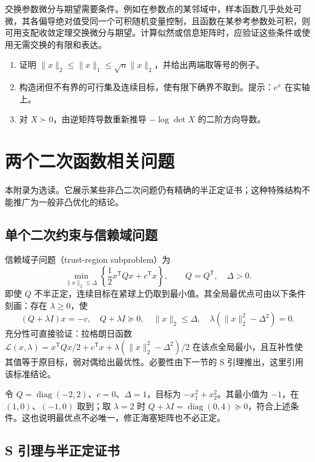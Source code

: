 \documentclass[UTF8,12pt,a4paper,fontset=fandol]{ctexbook}
\begin{document}
交换参数微分与期望需要条件。例如在参数点的某邻域中，样本函数几乎处处可微，其各偏导绝对值受同一个可积随机变量控制，且函数在某参考参数处可积，则可用支配收敛定理交换微分与期望。计算似然或信息矩阵时，应验证这些条件或使用无需交换的有限和表达。

\begin{enumerate}
 \item 证明 $\|x\|_2\leq\|x\|_1\leq\sqrt n\|x\|_2$，并给出两端取等号的例子。
 \item 构造闭但不有界的可行集及连续目标，使有限下确界不取到。提示：$e^x$ 在实轴上。
 \item 对 $X\succ0$，由逆矩阵导数重新推导 $-\log\det X$ 的二阶方向导数。
\end{enumerate}

\chapter{两个二次函数相关问题}
\label{app:co-quadratic}

本附录为选读。它展示某些非凸二次问题仍有精确的半正定证书；这种特殊结构不能推广为一般非凸优化的结论。

\section{单个二次约束与信赖域问题}

信赖域子问题（trust-region subproblem）为
\[
 \min_{\|x\|_2\leq\Delta}\left\{\frac12x^{\mathsf T}Qx+c^{\mathsf T}x\right\},
 \qquad Q=Q^{\mathsf T},\quad\Delta>0.
\]
即使 $Q$ 不半正定，连续目标在紧球上仍取到最小值。其全局最优点可由以下条件刻画：存在 $\lambda\geq0$，使
\[
 (Q+\lambda I)x=-c,\quad Q+\lambda I\succeq0,\quad
 \|x\|_2\leq\Delta,\quad\lambda(\|x\|_2^2-\Delta^2)=0.
\]
充分性可直接验证：拉格朗日函数 $\mathcal L(x,\lambda)=x^{\mathsf T}Qx/2+c^{\mathsf T}x+\lambda(\|x\|_2^2-\Delta^2)/2$ 在该点全局最小，且互补性使其值等于原目标，弱对偶给出最优性。必要性由下一节的 S 引理推出，这里引用该标准结论。

\begin{example}
令 $Q=\operatorname{diag}(-2,2)$、$c=0$、$\Delta=1$，目标为 $-x_1^2+x_2^2$。其最小值为 $-1$，在 $(1,0)$、$(-1,0)$ 取到；取 $\lambda=2$ 时 $Q+\lambda I=\operatorname{diag}(0,4)\succeq0$，符合上述条件。这也说明最优点不必唯一，修正海塞矩阵也不必正定。
\end{example}

\section{S 引理与半正定证书}
\end{document}
